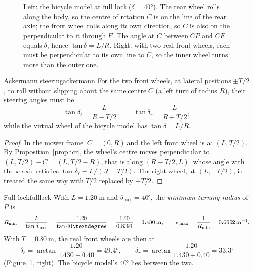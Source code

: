 \begin{figure}[ht]
  \caption{Left: the bicycle model at full lock ($\delta = 40°$). The rear
    wheel rolls along the body, so the centre of rotation $C$ is on the line
    of the rear axle; the front wheel rolls along its own direction, so $C$
    is also on the perpendicular to it through $F$. The angle at $C$ between
    $CP$ and $CF$ equals $\delta$, hence $\tan\delta = L/R$. Right: with two
    real front wheels, each must be perpendicular to its own line to $C$, so
    the inner wheel turns more than the outer one.}
  \label{fig:icr}
\end{figure}

\begin{proposition}{Ackermann steering}{ackermann}
  For the two front wheels, at lateral positions $\pm T/2$, to roll without
  slipping about the same centre $C$ (a left turn of radius $R$), their
  steering angles must be
  \[
    \tan\delta_\ell = \frac{L}{R - T/2}, \qquad
    \tan\delta_r = \frac{L}{R + T/2},
  \]
  while the virtual wheel of the bicycle model has $\tan\delta = L/R$.
\end{proposition}

\begin{proof}
  In the mower frame, $C = (0, R)$ and the left front wheel is at
  $(L, T/2)$. By Proposition~\ref{prop:icr}, the wheel's centre moves
  perpendicular to $(L, T/2) - C = (L, T/2 - R)$, that is along
  $(R - T/2, L)$, whose angle with the $x$ axis satisfies
  $\tan\delta_\ell = L/(R - T/2)$. The right wheel, at $(L, -T/2)$, is
  treated the same way with $T/2$ replaced by $-T/2$.
\end{proof}

\begin{example}{Full lock}{fulllock}
  With $L = \SI{1.20}{\metre}$ and $\delta_{\max} = 40°$, the
  \emph{minimum turning radius} of $P$ is
  \[
    \Rmin = \frac{L}{\tan\delta_{\max}} = \frac{1.20}{\tan 40°}
    = \frac{1.20}{0.8391} = \SI{1.430}{\metre},
    \qquad \kmax = \frac1{\Rmin} = \SI{0.6992}{\per\metre}.
  \]
  With $T = \SI{0.80}{\metre}$, the real front wheels are then at
  \[
    \delta_\ell = \arctan\frac{1.20}{1.430 - 0.40} = 49.4°,
    \qquad
    \delta_r = \arctan\frac{1.20}{1.430 + 0.40} = 33.3°
  \]
  (Figure~\ref{fig:icr}, right). The bicycle model's $40°$ lies between the
  two.
\end{example}

